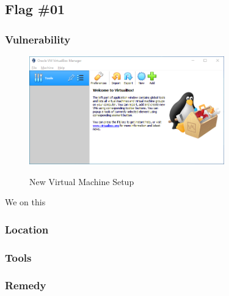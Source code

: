 \subsection{Flag \#01}

\subsubsection{Vulnerability}
\begin{figure}[!htb]
    \centering
    \includegraphics[width=0.752\textwidth]{images/Win00-00.png}\\[0cm]  
    \caption[Windows Virtual Box]{New Virtual Machine Setup}
    \label{fig:03-01 - Windows Virtual Box New VM} 
\end{figure}
We on this
\subsubsection{Location}

\subsubsection{Tools}

\subsubsection{Remedy}
